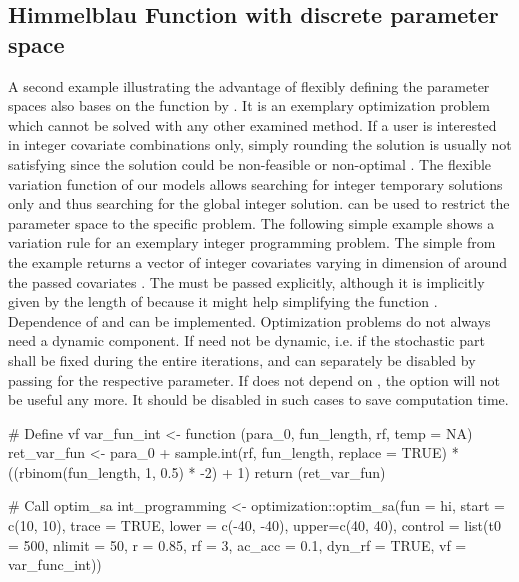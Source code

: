 \subsection{Himmelblau Function with discrete parameter space}
A second example illustrating the advantage of flexibly defining the parameter spaces also bases on the function by \citet{himmelblau_1972}. It is an exemplary optimization problem which cannot be solved with any other examined method. If a user is interested in integer covariate combinations only, simply rounding the solution is usually not satisfying since the solution could be non-feasible or non-optimal \citep{cardoso_1997}. The flexible variation function  of our models allows searching for integer temporary solutions only and thus searching for the global integer solution.  can be used to restrict the parameter space to the specific problem. The following simple example shows a variation rule for an exemplary integer programming problem. The simple  from the example returns a vector of integer covariates varying in dimension of  around the passed covariates . The  must be passed explicitly, although it is implicitly given by the length of  because it might help simplifying the function . Dependence of  and  can be implemented. Optimization problems do not always need a dynamic component. If  need not be dynamic, i.e. if the stochastic part shall be fixed during the entire iterations,  and  can separately be disabled by passing  for the respective parameter. If  does not depend on , the option  will not be useful any more. It should be disabled in such cases to save computation time.

\begin{example}
# Define vf
var_fun_int <- function (para_0, fun_length, rf, temp = NA) {
    ret_var_fun <- para_0 + sample.int(rf, fun_length, replace = TRUE) *
        ((rbinom(fun_length, 1, 0.5) * -2) + 1)
    return (ret_var_fun)
}

# Call optim_sa
int_programming <- optimization::optim_sa(fun = hi, start = c(10, 10), trace = TRUE, 
                                          lower = c(-40, -40), upper=c(40, 40),
                                          control = list(t0 = 500, nlimit = 50,
                                          r = 0.85, rf = 3, ac_acc = 0.1, 
                                          dyn_rf = TRUE, vf = var_func_int))
\end{example}

